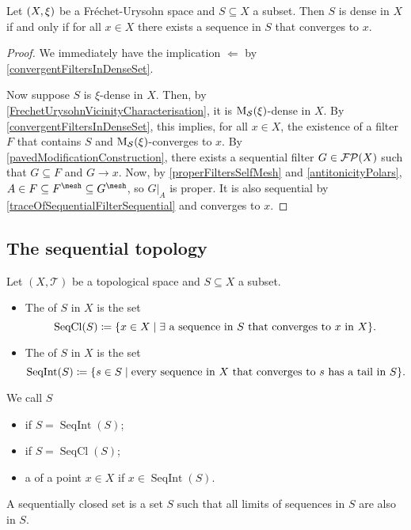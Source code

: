 \begin{lemma} \label{existenceConvergentSequenceDenseSubset}
Let $\sSet{X,\xi}$ be a Fréchet-Urysohn space and $S\subseteq X$ a subset. Then $S$ is dense in $X$ \textup{if and only if} for all $x\in X$ there exists a sequence in $S$ that converges to $x$.
\end{lemma}
\begin{proof}
We immediately have the implication $\Leftarrow$ by \ref{convergentFiltersInDenseSet}.

Now suppose $S$ is $\xi$-dense in $X$. Then, by \ref{FrechetUrysohnVicinityCharacterisation}, it is $\operatorname{M_\mathcal{S}}(\xi)$-dense in $X$. By \ref{convergentFiltersInDenseSet}, this implies, for all $x\in X$, the existence of a filter $F$ that contains $S$ and $\operatorname{M_\mathcal{S}}(\xi)$-converges to $x$.
By \ref{pavedModificationConstruction}, there exists a sequential filter $G\in \operatorname{\mathcal{FP}}(X)$ such that $G\subseteq F$ and $G\to x$. Now, by \ref{properFiltersSelfMesh} and \ref{antitonicityPolars}, $A \in F \subseteq F^\mesh \subseteq G^\mesh$, so $G|_A$ is proper. It is also sequential by \ref{traceOfSequentialFilterSequential} and converges to $x$.
\end{proof}

\subsection{The sequential topology}
\begin{definition}
Let $(X,\mathcal{T})$ be a topological space and $S\subseteq X$ a subset.
\begin{itemize}
\item The  of $S$ in $X$ is the set
\[ \operatorname{SeqCl}(S) \defeq \setbuilder{x\in X}{\text{$\exists$ a sequence in $S$ that converges to $x$ in $X$}}. \]
\item The  of $S$ in $X$ is the set
\[ \operatorname{SeqInt}(S) \defeq \setbuilder{s\in S}{\text{every sequence in $X$ that converges to $s$ has a tail in $S$}}. \]
\end{itemize}
We call $S$
\begin{itemize}
\item {} if $S = \operatorname{SeqInt}(S)$;
\item {} if $S = \operatorname{SeqCl}(S)$;
\item a  of a point $x\in X$ if $x\in \operatorname{SeqInt}(S)$.
\end{itemize}
\end{definition}
A sequentially closed set is a set $S$ such that all limits of sequences in $S$ are also in $S$.

